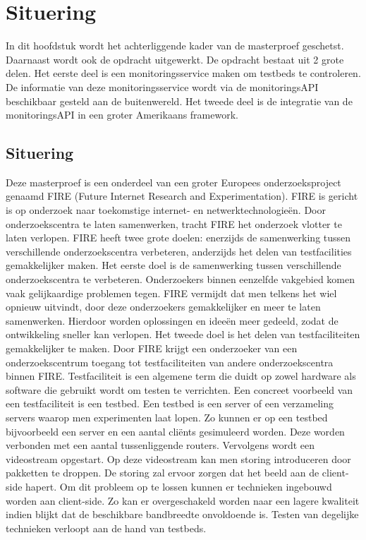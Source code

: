 \chapter{Situering}
{\samenvatting
In dit hoofdstuk wordt het achterliggende kader van de masterproef geschetst. Daarnaast wordt ook de opdracht uitgewerkt. De opdracht bestaat uit 2 grote delen. Het eerste deel is een monitoringsservice maken om testbeds te controleren. De informatie van deze monitoringsservice wordt via de monitoringsAPI beschikbaar gesteld aan de buitenwereld. Het tweede deel is de integratie van de monitoringsAPI in een groter Amerikaans framework.}
\section{Situering}
\npar
Deze masterproef is een onderdeel van een groter Europees onderzoeksproject genaamd FIRE (Future Internet Research and Experimentation). FIRE is gericht is op onderzoek naar toekomstige internet- en netwerktechnologie\"en. Door onderzoekscentra te laten samenwerken\citep{Fire-what-is}, tracht FIRE het onderzoek vlotter te laten verlopen. FIRE heeft twee grote doelen: enerzijds de samenwerking tussen verschillende onderzoekscentra verbeteren, anderzijds het delen van testfacilities gemakkelijker maken.
\npar
Het eerste doel is de samenwerking tussen verschillende onderzoekscentra te verbeteren. Onderzoekers binnen eenzelfde vakgebied komen vaak gelijkaardige problemen tegen. FIRE vermijdt dat men telkens het wiel opnieuw uitvindt, door deze onderzoekers gemakkelijker en meer te laten samenwerken. Hierdoor worden oplossingen en idee\"en meer gedeeld, zodat de ontwikkeling sneller kan verlopen.
\clearpage
\npar
Het tweede doel is het delen van testfaciliteiten gemakkelijker te maken. Door FIRE krijgt een onderzoeker van een onderzoekscentrum toegang tot testfaciliteiten van andere onderzoekscentra binnen FIRE. Testfaciliteit is een algemene term die duidt op zowel hardware als software die gebruikt wordt om testen te verrichten. Een concreet voorbeeld van een testfaciliteit is een testbed. Een testbed is een server of een verzameling servers waarop men experimenten laat lopen. Zo kunnen er op een testbed bijvoorbeeld een server en een aantal cli\"ents gesimuleerd worden. Deze worden verbonden met een aantal tussenliggende routers. Vervolgens wordt een videostream opgestart. Op deze videostream kan men storing introduceren door pakketten te droppen. De storing zal ervoor zorgen dat het beeld aan de client-side hapert. Om dit probleem op te lossen kunnen er technieken ingebouwd worden aan client-side. Zo kan er overgeschakeld worden naar een lagere kwaliteit indien blijkt dat de beschikbare bandbreedte onvoldoende is. Testen van degelijke technieken verloopt aan de hand van testbeds.
